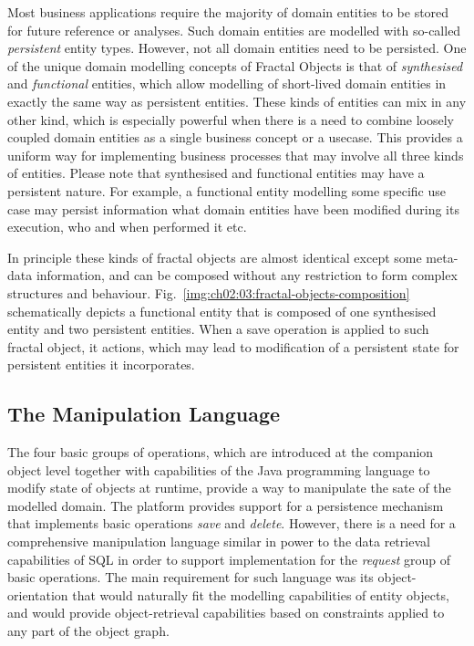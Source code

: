   Most business applications require the majority of domain entities to be stored for future reference or analyses.
  Such domain entities are modelled with so-called \emph{persistent} entity types.
  However, not all domain entities need to be persisted.
  One of the unique domain modelling concepts of Fractal Objects is that of \emph{synthesised} and \emph{functional} entities, which allow modelling of short-lived domain entities in exactly the same way as persistent entities.
  These kinds of entities can mix in any other kind, which is especially powerful when there is a need to combine loosely coupled domain entities as a single business concept or a usecase.
  This provides a uniform way for implementing business processes that may involve all three kinds of entities.
  Please note that synthesised and functional entities may have a persistent nature.
  For example, a functional entity modelling some specific use case may persist information what domain entities have been modified during its execution, who and when performed it etc.

  In principle these kinds of fractal objects are almost identical except some meta-data information, and can be composed without any restriction to form complex structures and behaviour.
  Fig.~\ref{img:ch02:03:fractal-objects-composition} schematically depicts a functional entity that is composed of one synthesised entity and two persistent entities.
  When a save operation is applied to such fractal object, it actions, which may lead to modification of a persistent state for persistent entities it incorporates.

  \subsection{The Manipulation Language}

  The four basic groups of operations, which are introduced at the companion object level together with capabilities of the Java programming language to modify state of objects at runtime, provide a way to manipulate the sate of the modelled domain.
  The platform provides support for a persistence mechanism that implements basic operations \emph{save} and \emph{delete}.
  However, there is a need for a comprehensive manipulation language similar in power to the data retrieval capabilities of SQL in order to support implementation for the \emph{request} group of basic operations.
  The main requirement for such language was its object-orientation that would naturally fit the modelling capabilities of entity objects, and would provide object-retrieval capabilities based on constraints applied to any part of the object graph.

